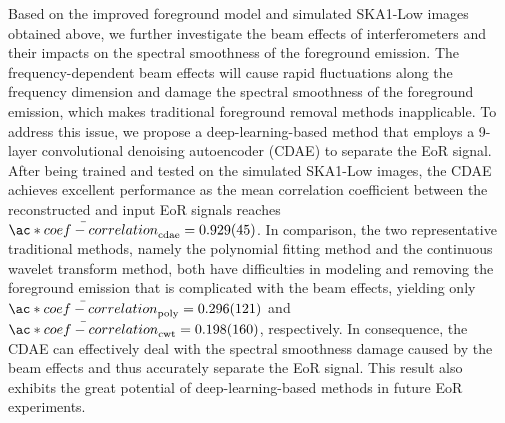 \begin{englishabstract}
Based on the improved foreground model and simulated SKA1-Low images
obtained above, we further investigate the beam effects of
interferometers and their impacts on the spectral smoothness of
the foreground emission.
The frequency-dependent beam effects will cause
rapid fluctuations along the frequency dimension and damage the
spectral smoothness of the foreground emission, which makes
traditional foreground removal methods inapplicable.
To address this issue, we propose a deep-learning-based method
that employs a 9-layer convolutional denoising autoencoder (CDAE) to
separate the EoR signal.
After being trained and tested on the simulated SKA1-Low images,
the CDAE achieves excellent performance as the mean correlation
coefficient between  the reconstructed and input EoR signals reaches
$\bar{\ac*{coef-correlation}}_{\R{cdae}} = \num{0.929 +- 0.045}$.
In comparison, the two representative traditional methods, namely the
polynomial fitting method and the continuous wavelet transform method,
both have difficulties in modeling and removing the foreground emission
that is complicated with the beam effects, yielding only
$\bar{\ac*{coef-correlation}}_{\R{poly}} = \num{0.296 +- 0.121}$ and
$\bar{\ac*{coef-correlation}}_{\R{cwt}} = \num{0.198 +- 0.160}$,
respectively.
In consequence, the CDAE can effectively deal with the spectral
smoothness damage caused by the beam effects and thus accurately
separate the EoR signal.
This result also exhibits the great potential of deep-learning-based
methods in future EoR experiments.

\end{englishabstract}
